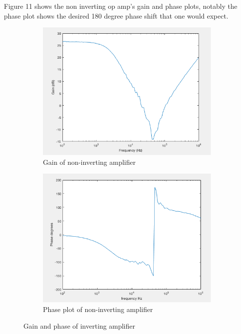 Figure 11 shows the non inverting op amp's gain and phase plots, notably the phase plot shows the desired 180 degree phase shift that one would expect.
	\begin{figure}[H]
		\centering
		\begin{subfigure}[b]{0.45\textwidth}
			\centering
			\includegraphics[scale=.40]{ExperimentalImplementation/gainnoninverting.png}
			\caption{Gain of non-inverting amplifier}
			\label{fig:gainnoninverting}
		\end{subfigure}
		\hfill
		\begin{subfigure}[b]{0.45\textwidth}
			\centering
			\includegraphics[scale=.40]{ExperimentalImplementation/phasenoninverting.png}
			\caption{Phase plot of non-inverting amplifier}
			\label{fig:phasenoninverting}
		\end{subfigure}
		\caption{Gain and phase of inverting amplifier}
		\label{fig:noninvertamp}
	\end{figure} 

